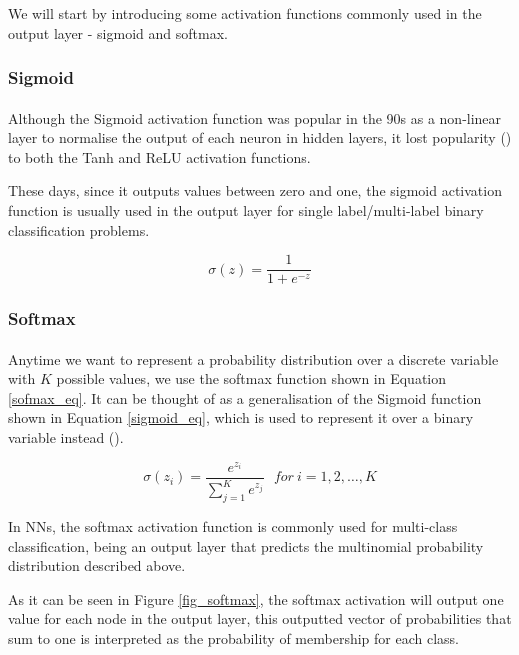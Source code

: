 We will start by introducing some activation functions commonly used in the output layer - sigmoid and softmax.

\subsubsection{Sigmoid}
\paragraph{}
Although the Sigmoid activation function was popular in the 90s as a non-linear layer to normalise the output of each neuron in hidden layers, it lost popularity (\cite{GoodBengCour16}) to both the Tanh and \gls{ReLU} activation functions.

These days, since it outputs values between zero and one, the sigmoid activation function is usually used in the output layer for single label/multi-label binary classification problems. 

\begin{equation}
    \label{sigmoid_eq}
    \sigma(z) = \frac{1} {1 + e^{-z}}
\end{equation}

\subsubsection{Softmax}
\paragraph{}
Anytime we want to represent a probability distribution over a discrete variable with $K$ possible values, we use the softmax function shown in Equation \ref{sofmax_eq}. It can be thought of as a generalisation of the Sigmoid function shown in Equation \ref{sigmoid_eq}, which is used to represent it over a binary variable instead (\cite{GoodBengCour16}).

\begin{equation}
    \label{sofmax_eq}
    \sigma(z_i) = \frac{e^{z_{i}}}{\sum_{j=1}^K e^{z_{j}}} \ \ \ for\ i=1,2,\dots,K
\end{equation}

In \gls{NN}s, the softmax activation function is commonly used for multi-class classification, being an output layer that predicts the multinomial probability distribution described above.

As it can be seen in Figure \ref{fig_softmax}, the softmax activation will output one value for each node in the output layer, this outputted vector of probabilities that sum to one is interpreted as the probability of membership for each class.

